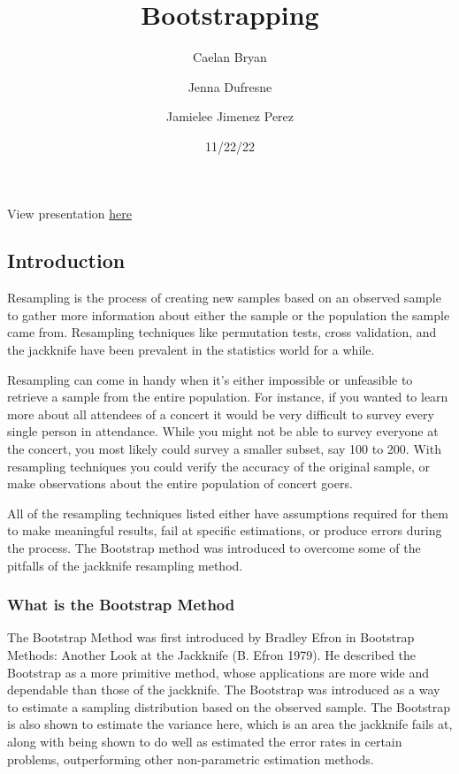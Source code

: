 \documentclass[
  letterpaper,
  DIV=11,
  numbers=noendperiod]{scrartcl}
\title{Bootstrapping}
\author{Caelan Bryan \and Jenna Dufresne \and Jamielee Jimenez Perez}
\date{11/22/22}
\begin{document}
\maketitle
\ifdefined\Shaded\renewenvironment{Shaded}{\begin{tcolorbox}[interior hidden, enhanced, frame hidden, borderline west={3pt}{0pt}{shadecolor}, breakable, boxrule=0pt, sharp corners]}{\end{tcolorbox}}\fi

View presentation \href{/Bootstrapping-Group-Presentation.html}{here}

\hypertarget{introduction}{%
\subsection{Introduction}\label{introduction}}

Resampling is the process of creating new samples based on an observed
sample to gather more information about either the sample or the
population the sample came from. Resampling techniques like permutation
tests, cross validation, and the jackknife have been prevalent in the
statistics world for a while.

Resampling can come in handy when it's either impossible or unfeasible
to retrieve a sample from the entire population. For instance, if you
wanted to learn more about all attendees of a concert it would be very
difficult to survey every single person in attendance. While you might
not be able to survey everyone at the concert, you most likely could
survey a smaller subset, say 100 to 200. With resampling techniques you
could verify the accuracy of the original sample, or make observations
about the entire population of concert goers.

All of the resampling techniques listed either have assumptions required
for them to make meaningful results, fail at specific estimations, or
produce errors during the process. The Bootstrap method was introduced
to overcome some of the pitfalls of the jackknife resampling method.

\hypertarget{what-is-the-bootstrap-method}{%
\subsubsection{What is the Bootstrap
Method}\label{what-is-the-bootstrap-method}}

The Bootstrap Method was first introduced by Bradley Efron in Bootstrap
Methods: Another Look at the Jackknife (B. Efron 1979). He described the
Bootstrap as a more primitive method, whose applications are more wide
and dependable than those of the jackknife. The Bootstrap was introduced
as a way to estimate a sampling distribution based on the observed
sample. The Bootstrap is also shown to estimate the variance here, which
is an area the jackknife fails at, along with being shown to do well as
estimated the error rates in certain problems, outperforming other
non-parametric estimation methods.
\end{document}
